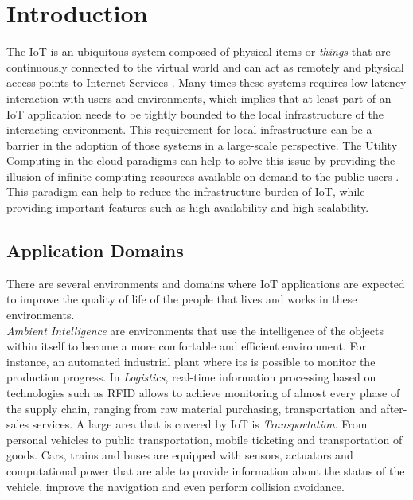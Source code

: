 

\section{Introduction}
\label{sec:introduction}
The \gls{IoT} is an ubiquitous system composed of physical items or \textit{things} that are continuously
connected to the virtual world and can act as remotely and physical access points to Internet Services \cite{mattern2010internet}.
Many times these systems requires low-latency interaction with users and environments, which implies
that at least part of an \gls{IoT} application needs to be tightly bounded to the local infrastructure
of the interacting environment. This requirement for local infrastructure can be a barrier in the
adoption of those systems in a large-scale perspective. The Utility Computing in the cloud paradigms
can help to solve this issue by providing the illusion of infinite computing resources available on
demand to the public users \cite{armbrust2010view}. This paradigm can help to reduce the infrastructure
burden of \gls{IoT}, while providing important features such as high availability and high scalability.

\subsection{Application Domains}
\label{subs:application_domains}
There are several environments and domains where \gls{IoT} applications are expected
to improve the quality of life of the people that lives and works in these environments.\\

\textit{Ambient Intelligence} are environments that use the intelligence of the objects within itself to
become a more comfortable and efficient environment. For instance, an automated industrial plant
where its is possible to monitor the production progress.
In \textit{Logistics}, real-time information processing based on technologies such as \gls{RFID} allows to
achieve monitoring of almost every phase of the supply chain, ranging from raw material purchasing,
transportation and after-sales services.
A large area that is covered by \gls{IoT} is \textit{Transportation}. From personal vehicles to public transportation,
mobile ticketing and transportation of goods. Cars, trains and buses are equipped with sensors, actuators
and computational power that are able to provide information about the status of the vehicle, improve
the navigation and even perform collision avoidance.\\

